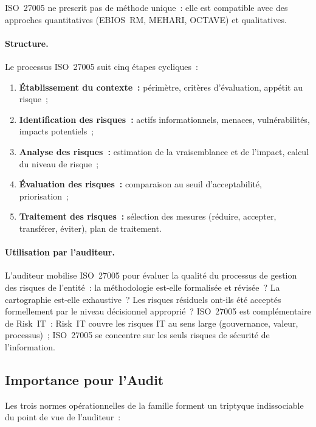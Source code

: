 ISO~27005 ne prescrit pas de méthode unique~: elle est compatible avec des approches
quantitatives (EBIOS~RM, MEHARI, OCTAVE) et qualitatives.

\paragraph{Structure.} Le processus ISO~27005 suit cinq étapes cycliques~:
\begin{enumerate}
    \item \textbf{Établissement du contexte~:} périmètre, critères d'évaluation,
        appétit au risque~;
    \item \textbf{Identification des risques~:} actifs informationnels, menaces,
        vulnérabilités, impacts potentiels~;
    \item \textbf{Analyse des risques~:} estimation de la vraisemblance et de l'impact,
        calcul du niveau de risque~;
    \item \textbf{Évaluation des risques~:} comparaison au seuil d'acceptabilité,
        priorisation~;
    \item \textbf{Traitement des risques~:} sélection des mesures (réduire, accepter,
        transférer, éviter), plan de traitement.
\end{enumerate}

\paragraph{Utilisation par l'auditeur.} L'auditeur mobilise ISO~27005 pour évaluer
la qualité du processus de gestion des risques de l'entité~: la méthodologie est-elle
formalisée et révisée~? La cartographie est-elle exhaustive~? Les risques résiduels
ont-ils été acceptés formellement par le niveau décisionnel approprié~? ISO~27005
est complémentaire de Risk~IT~: Risk~IT couvre les risques IT au sens large
(gouvernance, valeur, processus)~; ISO~27005 se concentre sur les seuls risques
de sécurité de l'information.

\subsection{Importance pour l'Audit}
\label{subsec:iso27000-audit}

Les trois normes opérationnelles de la famille forment un triptyque indissociable
du point de vue de l'auditeur~:

